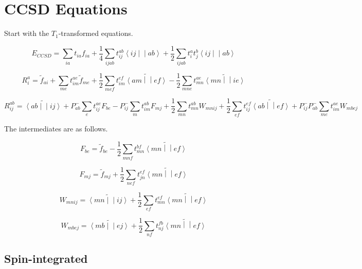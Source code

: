 \documentclass{article}
\newcommand{\tei}[2]{\left<{#1}\middle|\middle|{#2}\right>}
\begin{document}
\section{CCSD Equations}

Start with the $T_1$-transformed equations.

\begin{equation}
  E_{CCSD} = \sum_{ia}t_{ia}f_{ia} + \frac{1}{4}\sum_{ijab}t_{ij}^{ab}\tei{ij}{ab} + \frac{1}{2}\sum_{ijab}t_i^at_j^b\tei{ij}{ab}
\end{equation}

\begin{equation}
  R_i^a = \tilde{f}_{ai} + \sum_{me}t_{im}^{ae}\tilde{f}_{me} + \frac{1}{2}\sum_{mef}t_{im}^{ef}\widetilde{\tei{am}{ef}} - \frac{1}{2}\sum_{mne}t_{mn}^{ae}\widetilde{\tei{mn}{ie}}
\end{equation}

\begin{equation}
  R_{ij}^{ab} = \widetilde{\tei{ab}{ij}} + P_{ab}^-\sum_et_{ij}^{ae}F_{be} - P_{ij}^-\sum_mt_{im}^{ab}F_{mj} + \frac{1}{2}\sum_{mn}t_{mn}^{ab}W_{mnij} + \frac{1}{2}\sum_{ef}t_{ij}^{ef}\widetilde{\tei{ab}{ef}} + P_{ij}^-P_{ab}^-\sum_{me}t_{im}^{ae}W_{mbej}
\end{equation}

The intermediates are as follows.

\begin{equation}
  F_{be} = \tilde{f}_{be} - \frac{1}{2}\sum_{mnf}t_{mn}^{bf}\widetilde{\tei{mn}{ef}}
\end{equation}

\begin{equation}
  F_{mj} = \tilde{f}_{mj} + \frac{1}{2}\sum_{nef} t_{jn}^{ef}\widetilde{\tei{mn}{ef}}
\end{equation}

\begin{equation}
  W_{mnij} = \widetilde{\tei{mn}{ij}} + \frac{1}{2}\sum_{ef}t_{mn}^{ef}\widetilde{\tei{mn}{ef}}
\end{equation}

\begin{equation}
  W_{mbej} = \widetilde{\tei{mb}{ej}}  + \frac{1}{2}\sum_{nf}t_{nj}^{fb}\widetilde{\tei{mn}{ef}}
\end{equation}

\subsection{Spin-integrated}
\end{document}
